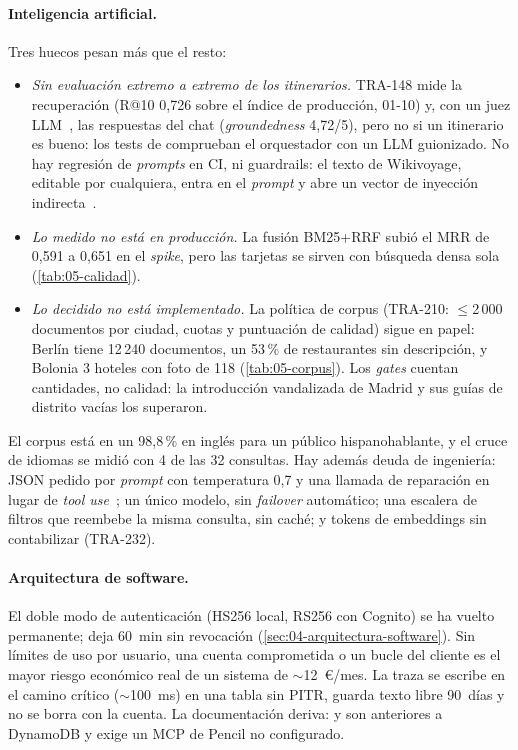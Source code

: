 \paragraph{Inteligencia artificial.} Tres huecos pesan más que el resto:
\begin{itemize}
\item \emph{Sin evaluación extremo a extremo de los itinerarios.} TRA-148 mide la recuperación
  (R@10 0,726 sobre el índice de producción, 01-10) y, con un juez LLM~\cite{cr:zheng2023judge},
  las respuestas del chat (\emph{groundedness} 4,72/5), pero no si un itinerario es bueno: los
  tests de  comprueban el orquestador con un LLM guionizado. No hay regresión de
  \emph{prompts} en CI, ni guardrails: el
  texto de Wikivoyage, editable por cualquiera, entra en el \emph{prompt} y abre un vector de
  inyección indirecta~\cite{cr:greshake2023injection}.
\item \emph{Lo medido no está en producción.} La fusión BM25+RRF subió el MRR de 0,591 a 0,651 en
  el \emph{spike}, pero las tarjetas se sirven con búsqueda densa sola (\cref{tab:05-calidad}).
\item \emph{Lo decidido no está implementado.} La política de corpus (TRA-210: $\leq$2\,000
  documentos por ciudad, cuotas y puntuación de calidad) sigue en papel: Berlín tiene 12\,240
  documentos, un 53\,\% de restaurantes sin descripción, y Bolonia 3 hoteles con foto de 118
  (\cref{tab:05-corpus}). Los \emph{gates} cuentan cantidades, no calidad: la introducción
  vandalizada de Madrid y sus guías de distrito vacías los superaron.
\end{itemize}
El corpus está en un 98,8\,\% en inglés para un público hispanohablante, y el cruce de idiomas se
midió con 4 de las 32 consultas. Hay además deuda de ingeniería: JSON pedido por \emph{prompt} con
temperatura 0,7 y una llamada de reparación en lugar de \emph{tool use}~\cite{cr:bedrocktooluse};
un único modelo, sin \emph{failover} automático; una escalera de filtros que reembebe la misma
consulta, sin caché; y tokens de embeddings sin contabilizar (TRA-232).

\paragraph{Arquitectura de software.} El doble modo de autenticación (HS256 local, RS256 con
Cognito) se ha vuelto permanente;  deja 60~min sin revocación
(\cref{sec:04-arquitectura-software}). Sin límites de uso por usuario, una cuenta comprometida o
un bucle del cliente es el mayor riesgo económico real de un sistema de $\sim$12~€/mes. La traza
se escribe en el camino crítico ($\sim$100~ms) en una tabla sin PITR, guarda texto libre 90~días
y no se borra con la cuenta. La documentación deriva:  y 
son anteriores a DynamoDB y  exige un MCP de Pencil no configurado.

